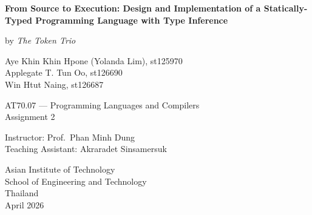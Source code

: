 \setcounter{page}{1}
\thispagestyle{empty}

\vspace*{\fill}

\begin{center}
    {\Large \bfseries From Source to Execution: Design and Implementation of a Statically-Typed Programming Language with Type Inference}

    \vspace{9em}

    by \textit{The Token Trio}
    \begin{center}
        Aye Khin Khin Hpone (Yolanda Lim), {\small st125970} \\[0.8em]
        Applegate T. Tun Oo, {\small st126690} \\[0.8em]
        Win Htut Naing, {\small st126687}
    \end{center}

    \vfill

    \begin{center}
        AT70.07 --- Programming Languages and Compilers \\
        Assignment 2
    \end{center}

    \vspace{3em}

    \begin{center}
        Instructor: Prof.\ Phan Minh Dung \\
        Teaching Assistant: Akraradet Sinsamersuk
    \end{center}

    \vspace{9em}

    Asian Institute of Technology \\
    School of Engineering and Technology \\
    Thailand \\
    April 2026
\end{center}

\vspace*{\fill}
